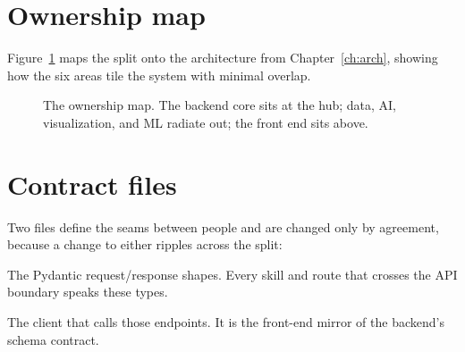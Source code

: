 \section{Ownership map}
Figure~\ref{fig:ownership} maps the split onto the architecture from
Chapter~\ref{ch:arch}, showing how the six areas tile the system with minimal
overlap.

\begin{figure}[h]
\centering
{}
\caption{The ownership map. The backend core sits at the hub; data, AI,
visualization, and ML radiate out; the front end sits above.}
\label{fig:ownership}
\end{figure}

\section{Contract files}
Two files define the seams between people and are changed only by agreement,
because a change to either ripples across the split:

\begin{description}[style=nextline,leftmargin=0pt]
  \item[\textcolor{uaIndigoD}{\code{app/models/schemas.py}} (Amir)]
    The Pydantic request/response shapes. Every skill and route that crosses the
    API boundary speaks these types.
  \item[\textcolor{uaIndigoD}{\code{frontend/src/lib/api.js}} (Ahmed)]
    The client that calls those endpoints. It is the front-end mirror of the
    backend's schema contract.
\end{description}

